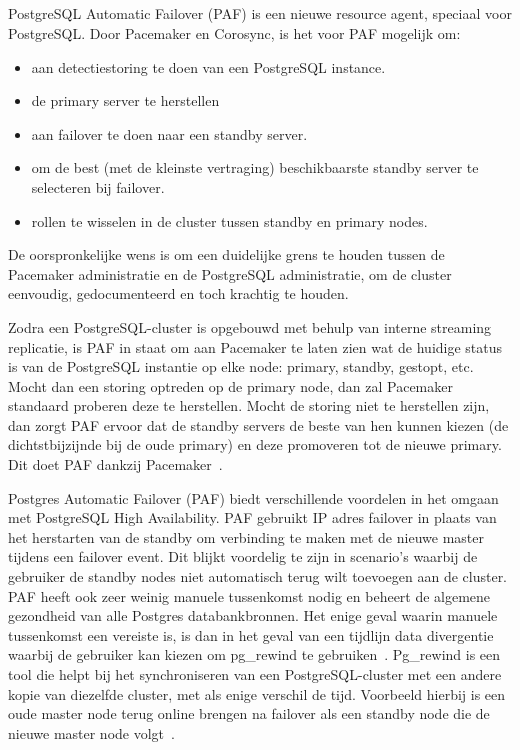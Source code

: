 \subsection{}
\label{subsec:PostgreSQL Automatic Failover (PAF)}

PostgreSQL Automatic Failover (PAF) is een nieuwe resource agent, speciaal voor PostgreSQL. Door Pacemaker en Corosync, is het voor PAF mogelijk om:

\begin{itemize}
    \item aan detectiestoring te doen van een PostgreSQL instance.
    \item de primary server te herstellen
    \item aan failover te doen naar een standby server.
    \item om de best (met de kleinste vertraging) beschikbaarste standby server te selecteren bij failover.
    \item rollen te wisselen in de cluster tussen standby en primary nodes.
\end{itemize}

De oorspronkelijke wens is om een duidelijke grens te houden tussen de Pacemaker administratie en de PostgreSQL administratie, om de cluster eenvoudig, gedocumenteerd en toch krachtig te houden.

Zodra een PostgreSQL-cluster is opgebouwd met behulp van interne streaming replicatie, is PAF in staat om aan Pacemaker te laten zien wat de huidige status is van de PostgreSQL instantie op elke node: primary, standby, gestopt, etc. Mocht dan een storing optreden op de primary node, dan zal Pacemaker standaard proberen deze te herstellen. Mocht de storing niet te herstellen zijn, dan zorgt PAF ervoor dat de standby servers de beste van hen kunnen kiezen (de dichtstbijzijnde bij de oude primary) en deze promoveren tot de nieuwe primary. Dit doet PAF dankzij Pacemaker~\autocite{Rimbault2020}. %

Postgres Automatic Failover (PAF) biedt verschillende voordelen in het omgaan met PostgreSQL High Availability. PAF gebruikt IP adres failover in plaats van het herstarten van de standby om verbinding te maken met de nieuwe master tijdens een failover event. Dit blijkt voordelig te zijn in scenario's waarbij de gebruiker de standby nodes niet automatisch terug wilt toevoegen aan de cluster. PAF heeft ook zeer weinig manuele tussenkomst nodig en beheert de algemene gezondheid van alle Postgres databankbronnen. Het enige geval waarin manuele tussenkomst een vereiste is, is dan in het geval van een tijdlijn data divergentie waarbij de gebruiker kan kiezen om pg\_rewind te gebruiken~\autocite{ScaleGrid2018a}. Pg\_rewind is een tool die helpt bij het synchroniseren van een PostgreSQL-cluster met een andere kopie van diezelfde cluster, met als enige verschil de tijd. Voorbeeld hierbij is een oude master node terug online brengen na failover als een standby node die de nieuwe master node volgt~\autocite{PostgreSQL2021b}. %

